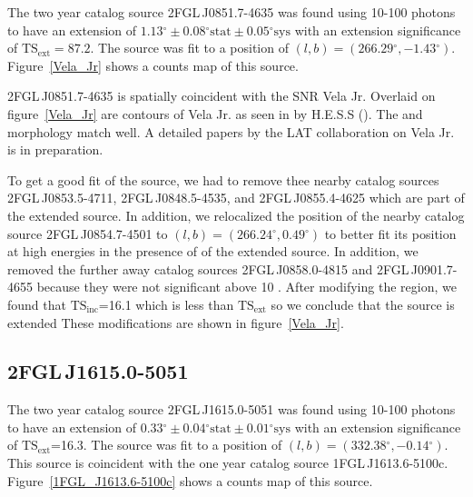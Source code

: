 \documentclass[12pt,preprint]{aastex}
\newcommand{\gev}{\text{GeV}\xspace}
\newcommand{\tev}{\text{TeV}\xspace}
\newcommand{\tsext}{{\ensuremath{\text{TS}_{\text{ext}}}}\xspace}
\newcommand{\tsinc}{\ensuremath{\text{TS}_{\text{inc}}}\xspace}
\newcommand{\sys}{\text{sys}\xspace}
\newcommand{\stat}{\text{stat}\xspace}
\renewcommand{\deg}{\ensuremath{^\circ}\xspace}
\begin{document}

The two year catalog source 2FGL\,J0851.7-4635 was found 
using 10-100 \gev photons to have an
extension of $1.13\deg\pm0.08\deg\stat\pm0.05\deg\sys$ 
with an extension
significance of $\tsext=87.2$.  The source was fit to a position of
$(l,b)=(266.29\deg,-1.43\deg)$.  Figure~\ref{Vela_Jr} shows a counts
map of this source.

2FGL\,J0851.7-4635 is spatially coincident with the SNR Vela Jr.
Overlaid on figure~\ref{Vela_Jr} are contours of Vela Jr. as seen in
\tev by H.E.S.S (\cite{vela_jr_hess}).  The \gev and \tev morphology
match well.  A detailed papers by the LAT collaboration on Vela Jr. is
in preparation.

To get a good fit of the source, we had to remove thee nearby catalog
sources 2FGL\,J0853.5-4711, 2FGL\,J0848.5-4535, and 2FGL\,J0855.4-4625
which are part of the extended source.  In addition, we relocalized
the position of the nearby catalog source 2FGL\,J0854.7-4501 to
$(l,b)=(266.24\deg,0.49\deg)$ to better fit its position at high energies
in the presence of of the extended source.  In addition, we removed the
further away catalog sources 2FGL\,J0858.0-4815 and 2FGL\,J0901.7-4655
because they were not significant above 10 \gev.  After modifying
the region, we found that \tsinc=16.1 which is less than \tsext so we
conclude that the source is extended These modifications are shown in
figure~\ref{Vela_Jr}.

\subsection{2FGL\,J1615.0-5051}
\label{section_2FGL_J1615.0-5051}


The two year catalog source 2FGL\,J1615.0-5051 was found using 10-100 \tev
photons to have an extension of $0.33\deg\pm0.04\deg\stat\pm0.01\deg\sys$
with an extension significance of \tsext=16.3.  The source
was fit to a position of $(l,b)=(332.38\deg,-0.14\deg)$.
This source is coincident with the one year catalog source
1FGL\,J1613.6-5100c. Figure~\ref{1FGL_J1613.6-5100c} shows a counts map
of this source.
\end{document}
